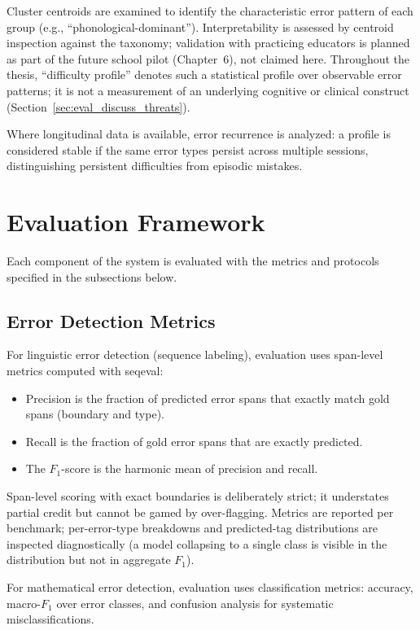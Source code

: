 Cluster centroids are examined to identify the characteristic error pattern of each group (e.g., ``phonological-dominant''). Interpretability is assessed by centroid inspection against the taxonomy; validation with practicing educators is planned as part of the future school pilot (Chapter~6), not claimed here. Throughout the thesis, ``difficulty profile'' denotes such a statistical profile over observable error patterns; it is not a measurement of an underlying cognitive or clinical construct (Section~\ref{sec:eval_discuss_threats}).

Where longitudinal data is available, error recurrence is analyzed: a profile is considered stable if the same error types persist across multiple sessions, distinguishing persistent difficulties from episodic mistakes.

\section{Evaluation Framework}
\label{sec:method_eval}

Each component of the system is evaluated with the metrics and protocols specified in the subsections below.

\subsection{Error Detection Metrics}
\label{sec:method_eval_detect}

For linguistic error detection (sequence labeling), evaluation uses span-level metrics computed with seqeval:
\begin{itemize}
    \item Precision is the fraction of predicted error spans that exactly match gold spans (boundary and type).
    \item Recall is the fraction of gold error spans that are exactly predicted.
    \item The $F_1$-score is the harmonic mean of precision and recall.
\end{itemize}

Span-level scoring with exact boundaries is deliberately strict; it understates partial credit but cannot be gamed by over-flagging. Metrics are reported per benchmark; per-error-type breakdowns and predicted-tag distributions are inspected diagnostically (a model collapsing to a single class is visible in the distribution but not in aggregate $F_1$).

For mathematical error detection, evaluation uses classification metrics: accuracy, macro-$F_1$ over error classes, and confusion analysis for systematic misclassifications.


